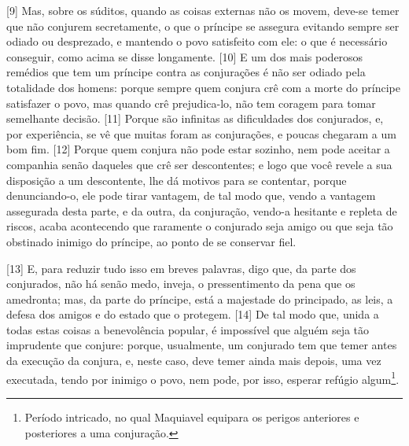 {[}9{]} Mas, sobre os súditos, quando as coisas externas não os movem,
deve-se temer que não conjurem secretamente, o que o príncipe se
assegura evitando sempre ser odiado ou desprezado, e mantendo o povo
satisfeito com ele: o que é necessário conseguir, como acima se disse
longamente. {[}10{]} E um dos mais poderosos remédios que tem um
príncipe contra as conjurações é não ser odiado pela totalidade dos
homens: porque sempre quem conjura crê com a morte do príncipe
satisfazer o povo, mas quando crê prejudica-lo, não tem coragem para
tomar semelhante decisão. {[}11{]} Porque são infinitas as dificuldades
dos conjurados, e, por experiência, se vê que muitas foram as
conjurações, e poucas chegaram a um bom fim. {[}12{]} Porque quem
conjura não pode estar sozinho, nem pode aceitar a companhia senão
daqueles que crê ser descontentes; e logo que você revele a sua
disposição a um descontente, lhe dá motivos para se contentar, porque
denunciando-o, ele pode tirar vantagem, de tal modo que, vendo a
vantagem assegurada desta parte, e da outra, da conjuração, vendo-a
hesitante e repleta de riscos, acaba acontecendo que raramente o
conjurado seja amigo ou que seja tão obstinado inimigo do príncipe, ao
ponto de se conservar fiel.

{[}13{]} E, para reduzir tudo isso em breves
palavras, digo que, da parte dos conjurados, não há senão medo, inveja,
o pressentimento da pena que os amedronta; mas, da parte do príncipe,
está a majestade do principado, as leis, a defesa dos amigos e do estado
que o protegem. {[}14{]} De tal modo que, unida a todas estas coisas a
benevolência popular, é impossível que alguém seja tão imprudente que
conjure: porque, usualmente, um conjurado tem que temer antes da
execução da conjura, e, neste caso, deve temer ainda mais depois, uma
vez executada, tendo por inimigo o povo, nem pode, por isso, esperar
refúgio algum\footnote{Período intricado, no qual Maquiavel equipara os
  perigos anteriores e posteriores a uma conjuração.}.

